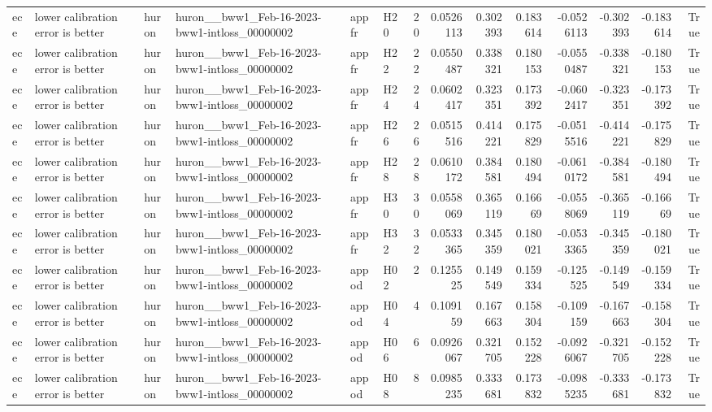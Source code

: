 \begin{longtable}{llllllrrrrrrrr}
ece & lower calibration error is better & huron & huron\_\_bww1\_Feb-16-2023-bww1-intloss\_00000002 & appfr & H20 & 20 & 0.0526113 & 0.302393 & 0.183614 & -0.0526113 & -0.302393 & -0.183614 & True \\
ece & lower calibration error is better & huron & huron\_\_bww1\_Feb-16-2023-bww1-intloss\_00000002 & appfr & H22 & 22 & 0.0550487 & 0.338321 & 0.180153 & -0.0550487 & -0.338321 & -0.180153 & True \\
ece & lower calibration error is better & huron & huron\_\_bww1\_Feb-16-2023-bww1-intloss\_00000002 & appfr & H24 & 24 & 0.0602417 & 0.323351 & 0.173392 & -0.0602417 & -0.323351 & -0.173392 & True \\
ece & lower calibration error is better & huron & huron\_\_bww1\_Feb-16-2023-bww1-intloss\_00000002 & appfr & H26 & 26 & 0.0515516 & 0.414221 & 0.175829 & -0.0515516 & -0.414221 & -0.175829 & True \\
ece & lower calibration error is better & huron & huron\_\_bww1\_Feb-16-2023-bww1-intloss\_00000002 & appfr & H28 & 28 & 0.0610172 & 0.384581 & 0.180494 & -0.0610172 & -0.384581 & -0.180494 & True \\
ece & lower calibration error is better & huron & huron\_\_bww1\_Feb-16-2023-bww1-intloss\_00000002 & appfr & H30 & 30 & 0.0558069 & 0.365119 & 0.16669 & -0.0558069 & -0.365119 & -0.16669 & True \\
ece & lower calibration error is better & huron & huron\_\_bww1\_Feb-16-2023-bww1-intloss\_00000002 & appfr & H32 & 32 & 0.0533365 & 0.345359 & 0.180021 & -0.0533365 & -0.345359 & -0.180021 & True \\
ece & lower calibration error is better & huron & huron\_\_bww1\_Feb-16-2023-bww1-intloss\_00000002 & appod & H02 & 2 & 0.125525 & 0.149549 & 0.159334 & -0.125525 & -0.149549 & -0.159334 & True \\
ece & lower calibration error is better & huron & huron\_\_bww1\_Feb-16-2023-bww1-intloss\_00000002 & appod & H04 & 4 & 0.109159 & 0.167663 & 0.158304 & -0.109159 & -0.167663 & -0.158304 & True \\
ece & lower calibration error is better & huron & huron\_\_bww1\_Feb-16-2023-bww1-intloss\_00000002 & appod & H06 & 6 & 0.0926067 & 0.321705 & 0.152228 & -0.0926067 & -0.321705 & -0.152228 & True \\
ece & lower calibration error is better & huron & huron\_\_bww1\_Feb-16-2023-bww1-intloss\_00000002 & appod & H08 & 8 & 0.0985235 & 0.333681 & 0.173832 & -0.0985235 & -0.333681 & -0.173832 & True \\

\end{longtable}
